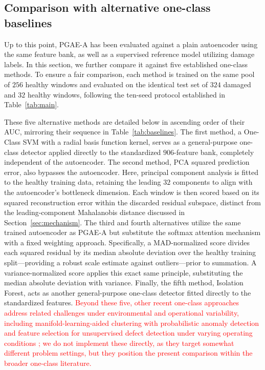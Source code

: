 \documentclass[11pt,a4paper]{article}
\begin{document}
\subsection{Comparison with alternative one-class baselines}
\label{sec:baselines}

Up to this point, PGAE-A has been evaluated against a plain autoencoder using
the same feature bank, as well as a supervised reference model utilizing
damage labels. In this section, we further compare it against five
established one-class methods. To ensure a fair comparison, each method is
trained on the same pool of $256$ healthy windows and evaluated on the
identical test set of $324$ damaged and $32$ healthy windows, following the
ten-seed protocol established in Table~\ref{tab:main}.

These five alternative methods are detailed below in ascending order of
their AUC, mirroring their sequence in Table~\ref{tab:baselines}. The first
method, a One-Class SVM with a radial basis function kernel, serves as a
general-purpose one-class detector applied directly to the standardized
$906$-feature bank, completely independent of the autoencoder. The second
method, PCA squared prediction error, also bypasses the autoencoder. Here,
principal component analysis is fitted to the healthy training data,
retaining the leading $32$ components to align with the autoencoder's
bottleneck dimension. Each window is then scored based on its squared
reconstruction error within the discarded residual subspace, distinct from
the leading-component Mahalanobis distance discussed in
Section~\ref{sec:mechanism}. The third and fourth alternatives utilize the
same trained autoencoder as PGAE-A but substitute the softmax attention
mechanism with a fixed weighting approach. Specifically, a MAD-normalized
score divides each squared residual by its median absolute deviation over
the healthy training split---providing a robust scale estimate against
outliers---prior to summation. A variance-normalized score applies this
exact same principle, substituting the median absolute deviation with
variance. Finally, the fifth method, Isolation Forest, acts as another
general-purpose one-class detector fitted directly to the standardized
features.
\textcolor{red}{Beyond these five, other recent one-class approaches
address related challenges under environmental and operational variability,
including manifold-learning-aided clustering with probabilistic anomaly
detection \cite{entezami2025mssp} and feature selection for unsupervised
defect detection under varying operating conditions \cite{ashkarkalaei2025};
we do not implement these directly, as they target somewhat different
problem settings, but they position the present comparison within the
broader one-class literature.}
\end{document}
